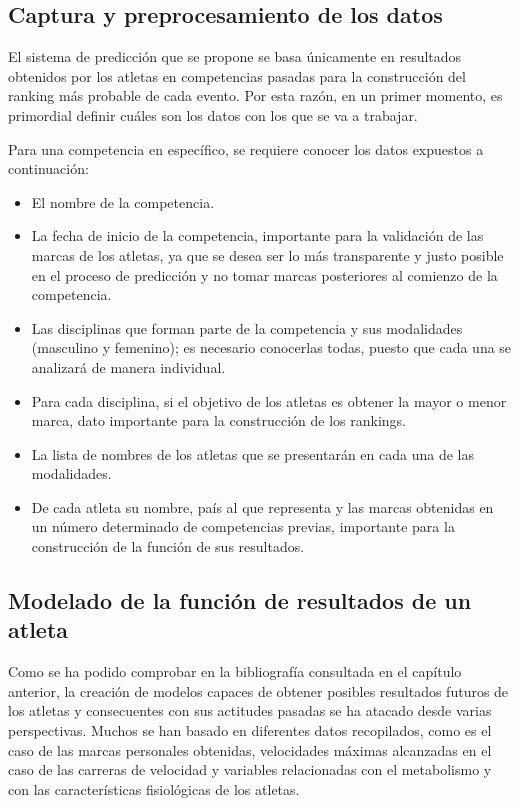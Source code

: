 \subsection{Captura y preprocesamiento de los datos}

El sistema de predicción que se propone se basa únicamente en resultados obtenidos por los atletas en competencias pasadas para la construcción del ranking más probable de cada evento. Por esta razón, en un primer momento, es primordial definir cuáles son los datos con los que se va a trabajar.

Para una competencia en específico, se requiere conocer los datos expuestos a continuación: 

\begin{itemize}
    \item El nombre de la competencia.
    \item La fecha de inicio de la competencia, importante para la validación de las marcas de los atletas, ya que se desea ser lo más transparente y justo posible en el proceso de predicción y no tomar marcas posteriores al comienzo de la competencia.
    \item Las disciplinas que forman parte de la competencia y sus modalidades (masculino y femenino); es necesario conocerlas todas, puesto que cada una se analizará de manera individual.
    \item Para cada disciplina, si el objetivo de los atletas es obtener la mayor o menor marca, dato importante para la construcción de los rankings.
    \item La lista de nombres de los atletas que se presentarán en cada una de las modalidades.
    \item De cada atleta su nombre, país al que representa y las marcas obtenidas en un número determinado de competencias previas, importante para la construcción de la función de sus resultados.
\end{itemize}

\subsection{Modelado de la función de resultados de un atleta}

Como se ha podido comprobar en la bibliografía consultada en el capítulo anterior, la creación de modelos capaces de obtener posibles resultados futuros de los atletas y consecuentes con sus actitudes pasadas se ha atacado desde varias perspectivas. Muchos se han basado en diferentes datos recopilados, como es el caso de las marcas personales obtenidas, velocidades máximas alcanzadas en el caso de las carreras de velocidad y variables relacionadas con el metabolismo y con las características fisiológicas de los atletas.


